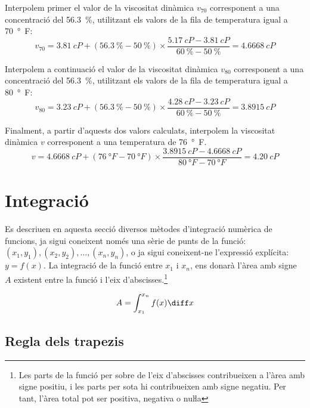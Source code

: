 \begin{exemple}
    Interpolem primer el valor de la viscositat dinàmica $v_{70}$ corresponent a una concentració del \qty{56,3}{\percent}, utilitzant els valors de la fila de temperatura igual a  \qty{70}{\degree F}:
    \[
         v_{70}=\qty{3,81}{cP}+(\qty{56,3}{\percent}-\qty{50}{\percent})\times
         \frac{\qty{5,17}{cP}-\qty{3,81}{cP}}{\qty{60}{\percent}-\qty{50}{\percent}}=\qty{4,6668}{cP}
    \]

    Interpolem a continuació el valor de la viscositat dinàmica $v_{80}$ corresponent a una concentració del \qty{56,3}{\percent}, utilitzant els valors de la fila de temperatura igual a  \qty{80}{\degree F}:
    \[
         v_{80} =\qty{3,23}{cP}+(\qty{56,3}{\percent}-\qty{50}{\percent})\times
         \frac{\qty{4,28}{cP}-\qty{3,23}{cP}}{\qty{60}{\percent}-\qty{50}{\percent}}=\qty{3,8915}{cP}
    \]

    Finalment, a partir d'aquests dos valors calculats, interpolem la viscositat dinàmica $v$ corresponent  a una temperatura de
    \qty{76}{\degree F}.
    \[
         v =\qty{4,6668}{cP}+(\qty{76}{\degree F}-\qty{70}{\degree F})\times
         \frac{\qty{3,8915}{cP}-\qty{4,6668}{cP}}{\qty{80}{\degree F}-\qty{70}{\degree F}}=\qty{4,20}{cP}
    \]

\end{exemple}

\section{Integració}\label{sec:int-mum}

Es descriuen en aquesta secció diversos mètodes d'integració numèrica de funcions, ja sigui coneixent només una sèrie de punts de la funció: $(x_1, y_1), (x_2, y_2), \dots ,(x_n, y_n)$, o ja sigui coneixent-ne l'expressió explícita: $y=f(x)$. La integració de la funció entre $x_1$ i $x_n$, ens donarà l'àrea amb signe $A$ existent entre la funció i l'eix d'abscisses.\footnote{Les parts de la funció per sobre de l'eix d'abscisses contribueixen a l'àrea amb signe positiu, i les parts per sota hi contribueixen amb signe negatiu. Per tant, l'àrea total pot ser positiva, negativa o nuŀla}

 \begin{equation}
    A = \int_{x_1}^{x_n} f(x) \diff x
 \end{equation}

\subsection{Regla dels trapezis}
\label{sec:trapezis}

